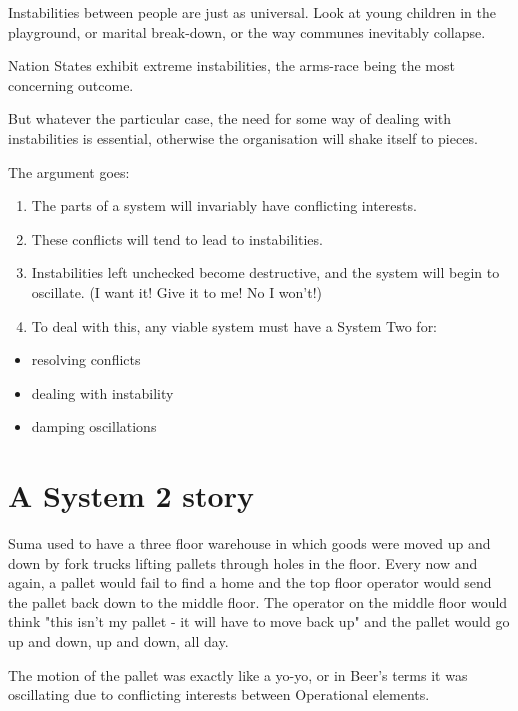 Instabilities between people are just as universal. Look at young children in the playground, or marital break-down, or the way communes inevitably collapse.

Nation States exhibit extreme instabilities, the arms-race being the most concerning outcome.

But whatever the particular case, the need for some way of dealing with instabilities is essential, otherwise the organisation will shake itself to pieces.

The argument goes:

\begin{enumerate}
  \item The parts of a system will invariably have conflicting interests.

  \item These conflicts will tend to lead to instabilities.

  \item Instabilities left unchecked become destructive, and the system will begin to oscillate. (I want it! Give it to me! No I won't!)

  \item To deal with this, any viable system must have a System Two for:

\end{enumerate}

\begin{itemize}
  \item resolving conflicts

  \item dealing with instability

  \item damping oscillations

\end{itemize}

\section*{A System 2 story}
Suma used to have a three floor warehouse in which goods were moved up and down by fork trucks lifting pallets through holes in the floor. Every now and again, a pallet would fail to find a home and the top floor operator would send the pallet back down to the middle floor. The operator on the middle floor would think "this isn't my pallet - it will have to move back up" and the pallet would go up and down, up and down, all day.

The motion of the pallet was exactly like a yo-yo, or in Beer's terms it was oscillating due to conflicting interests between Operational elements.

